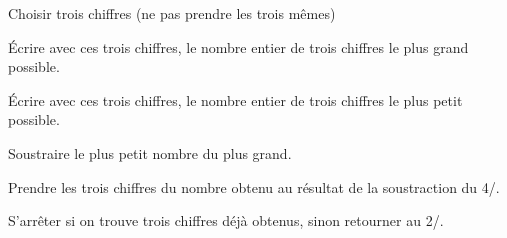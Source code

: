 \par
\begin{myenumerate}
\item Choisir trois chiffres (ne pas prendre les trois mêmes)
\item \'Ecrire avec ces trois chiffres, le nombre entier de trois chiffres le plus grand possible.
\item \'Ecrire avec ces trois chiffres, le nombre entier de trois chiffres le plus petit  possible.
\item Soustraire le plus petit nombre du plus grand.
\item Prendre les trois chiffres du nombre obtenu au résultat de la soustraction du 4/.
\item S'arrêter si on trouve trois chiffres déjà obtenus, sinon retourner au 2/.\end{myenumerate}
